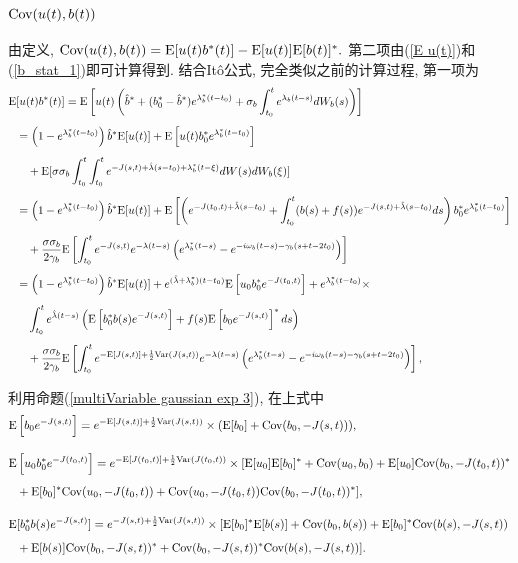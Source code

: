 \documentclass[notitlepage,cs4size,punct,oneside]{ctexrep}
\numberwithin{equation}{section}
\theoremstyle{mystyle}
\newcommand{\nq}{\\[5pt]}
\newcommand{\nw}{\\[10pt]}
\begin{document}
\subsubsection{$\text{Cov}(u(t), b(t))$}
由定义,
$
\text{Cov}(u(t), b(t)) = \text{E}[u(t)b^*(t)] - \text{E}[u(t)]\text{E}[b(t)]^*.
$
第二项由(\ref{E u(t)})和(\ref{b_stat_1})即可计算得到. 结合It\^o公式, 完全类似之前的计算过程, 第一项为
\[
\begin{split}
\E&[u(t)b^*(t)] = \E\left[u(t)\left(\hat{b}^*+(b_0^*-\hat{b}^*)e^{\lambda_b^*(t-t_0)}+\sigma_b\int_{t_0}^t e^{\lambda_b(t-s)}dW_b(s)\right)\right] \nq
&= \left(1-e^{\lambda_b^*(t-t_0)}\right)\hat{b}^*\E[u(t)] + \E\left[u(t)b_0^*e^{\lambda_b^*(t-t_0)}\right] \nq
&\quad + \E[\sigma\sigma_b\int_{t_0}^t\int_{t_0}^te^{-J(s, t)+\hat\lambda(s-t_0)+\lambda_b^*(t-\xi)}dW(s)dW_b(\xi)] \nq
&= \left(1-e^{\lambda_b^*(t-t_0)}\right)\hat{b}^*\E[u(t)] + \E\left[\left(e^{-J(t_0, t)+\hat\lambda(s-t_0)}+\int_{t_0}^t (b(s)+f(s))e^{-J(s, t)+\hat\lambda(s-t_0)}ds\right)b_0^*e^{\lambda_b^*(t-t_0)}\right] \nq
&\quad + \frac{\sigma\sigma_b}{2\gamma_b}\E\left[\int_{t_0}^t e^{-J(s, t)}e^{-\lambda(t-s)}\left(e^{\lambda_b^*(t-s)}-e^{-i\omega_b(t-s)-\gamma_b(s+t-2t_0)}\right)\right] \nq
&= \left(1-e^{\lambda_b^*(t-t_0)}\right)\hat{b}^*\E[u(t)] + e^{(\hat\lambda+\lambda_b^*)(t-t_0)}\E\left[u_0b_0^*e^{-J(t_0, t)}\right] + e^{\lambda_b^*(t-t_0)}\times \nq
&\quad \int_{t_0}^t e^{\hat\lambda(t-s)}\left(\E\left[b_0^*b(s)e^{-J(s, t)}\right]+f(s)\E\left[b_0e^{-J(s, t)}\right]^*ds\right) \nq
&\quad + \frac{\sigma\sigma_b}{2\gamma_b}\E\left[\int_{t_0}^t e^{-\E[J(s, t)]+\frac{1}{2}\Var(J(s, t))}e^{-\lambda(t-s)}\left(e^{\lambda_b^*(t-s)}-e^{-i\omega_b(t-s)-\gamma_b(s+t-2t_0)}\right)\right],
\end{split}
\]

利用命题(\ref{multiVariable gaussian exp 3}), 在上式中
\[
\begin{split}
\E&\left[b_0e^{-J(s, t)}\right] = e^{-\E[J(s, t)]+\frac{1}{2}\Var(J(s, t))}\times(\E[b_0]+\Cov(b_0, -J(s, t))), \nw
\E&\left[u_0b_0^*e^{-J(t_0, t)}\right] = e^{-\E[J(t_0, t)]+\frac{1}{2}\Var(J(t_0, t))}\times[\E[u_0]\E[b_0]^*+\Cov(u_0, b_0)+\E[u_0]\Cov(b_0, -J(t_0, t))^*\nq
&+\E[b_0]^*\Cov(u_0, -J(t_0, t)) + \Cov(u_0, -J(t_0, t))\Cov(b_0, -J(t_0, t))^*], \nw
\E&[b_0^*b(s)e^{-J(s, t)}] = e^{-J(s, t)+\frac{1}{2}\Var(J(s, t))}\times [\E[b_0]^*\E[b(s)]+\Cov(b_0, b(s))+\E[b_0]^*\Cov(b(s), -J(s, t))\nq
&+\E[b(s)]\Cov(b_0, -J(s, t))^*+\Cov(b_0, -J(s, t))^*\Cov(b(s), -J(s, t))].
\end{split}
\]
\\
\end{document}
